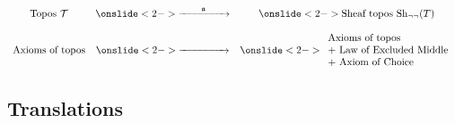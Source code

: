 \documentclass{beamer}
\newcommand \Sh[1] {\mathrm{Sh}_{#1}}
\begin{document}
\begin{frame}
  \begin{center}
    \[
    \begin{array}{ccc}
      \text{Topos }\mathcal T &
      \onslide<2->{\xrightarrow{\qquad\mathfrak a\qquad}} &
      \onslide<2->{\text{Sheaf topos } \Sh{\lnot\lnot}(T)} \\
        && \\
        \text{Axioms of topos} & \onslide<2->{\xrightarrow{\qquad~\qquad}}
        &\onslide<2->{
          \begin{array}{l}
            \text{Axioms of topos} \\ \text{+ Law of Excluded Middle}
            \\ \text{+ Axiom of Choice}
          \end{array}
          }
    \end{array}
    \]
  \end{center}
\end{frame}

\subsection{Translations}
\label{sec:translations}
\end{document}
